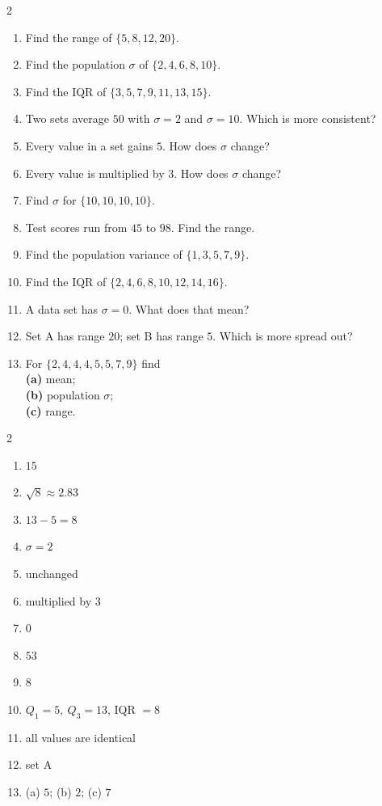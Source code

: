 \documentclass[11pt]{article}
\begin{document}
\begin{recapbox}
\begin{multicols}{2}
\small
\begin{enumerate}[leftmargin=*,itemsep=3pt]
  \item Find the range of $\{5,8,12,20\}$.
  \item Find the population $\sigma$ of $\{2,4,6,8,10\}$.
  \item Find the IQR of $\{3,5,7,9,11,13,15\}$.
  \item Two sets average $50$ with $\sigma=2$ and $\sigma=10$. Which is more consistent?
  \item Every value in a set gains $5$. How does $\sigma$ change?
  \item Every value is multiplied by $3$. How does $\sigma$ change?
  \item Find $\sigma$ for $\{10,10,10,10\}$.
  \item Test scores run from $45$ to $98$. Find the range.
  \item Find the population variance of $\{1,3,5,7,9\}$.
  \item Find the IQR of $\{2,4,6,8,10,12,14,16\}$.
  \item A data set has $\sigma=0$. What does that mean?
  \item Set A has range $20$; set B has range $5$. Which is more spread out?
  \item For $\{2,4,4,4,5,5,7,9\}$ find \\ \textbf{(a)} mean; \\ \textbf{(b)} population $\sigma$; \\ \textbf{(c)} range.
\end{enumerate}
\end{multicols}
\end{recapbox}

\begin{keybox}
\begin{multicols}{2}
\small
\begin{enumerate}[leftmargin=*,itemsep=3pt]
  \item $15$
  \item $\sqrt{8}\approx2.83$
  \item $13-5=8$
  \item $\sigma=2$
  \item unchanged
  \item multiplied by $3$
  \item $0$
  \item $53$
  \item $8$
  \item $Q_1=5,\ Q_3=13$, IQR $=8$
  \item all values are identical
  \item set A
  \item (a) $5$; (b) $2$; (c) $7$
\end{enumerate}
\end{multicols}
\end{keybox}
\end{document}
